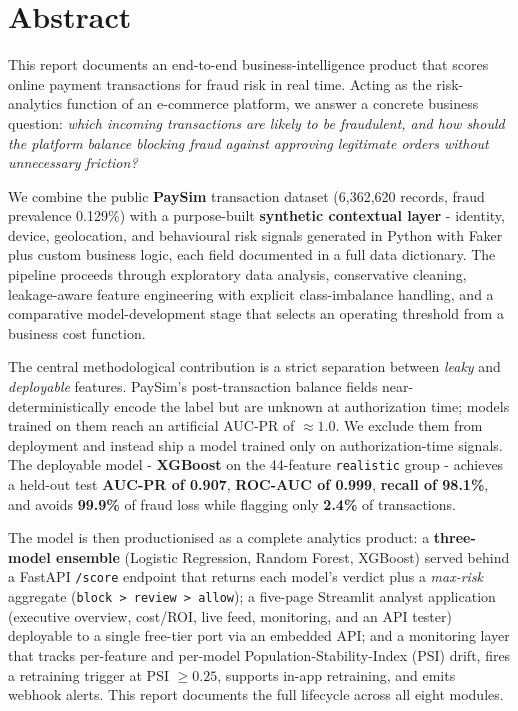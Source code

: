 \documentclass[11pt,a4paper]{report}
\newcommand{\code}[1]{\texttt{\small #1}}
\begin{document}
\chapter*{Abstract}
\thispagestyle{fancy}

This report documents an end-to-end business-intelligence product that scores online
payment transactions for fraud risk in real time. Acting as the risk-analytics function
of an e-commerce platform, we answer a concrete business question: \emph{which incoming
transactions are likely to be fraudulent, and how should the platform balance blocking
fraud against approving legitimate orders without unnecessary friction?}

We combine the public \textbf{PaySim} transaction dataset (6{,}362{,}620 records, fraud
prevalence 0.129\%) with a purpose-built \textbf{synthetic contextual layer} - identity,
device, geolocation, and behavioural risk signals generated in Python with Faker plus
custom business logic, each field documented in a full data dictionary. The pipeline
proceeds through exploratory data analysis, conservative cleaning, leakage-aware feature
engineering with explicit class-imbalance handling, and a comparative model-development
stage that selects an operating threshold from a business cost function.

The central methodological contribution is a strict separation between \emph{leaky} and
\emph{deployable} features. PaySim's post-transaction balance fields near-deterministically
encode the label but are unknown at authorization time; models trained on them reach an
artificial AUC-PR of $\approx 1.0$. We exclude them from deployment and instead ship a
model trained only on authorization-time signals. The deployable model - \textbf{XGBoost}
on the 44-feature \code{realistic} group - achieves a held-out test \textbf{AUC-PR of
0.907}, \textbf{ROC-AUC of 0.999}, \textbf{recall of 98.1\%}, and avoids \textbf{99.9\%}
of fraud loss while flagging only \textbf{2.4\%} of transactions.

The model is then productionised as a complete analytics product: a \textbf{three-model
ensemble} (Logistic Regression, Random Forest, XGBoost) served behind a FastAPI
\code{/score} endpoint that returns each model's verdict plus a \emph{max-risk} aggregate
(\code{block > review > allow}); a five-page Streamlit analyst application (executive
overview, cost/ROI, live feed, monitoring, and an API tester) deployable to a single free-tier port via an
embedded API; and a monitoring layer that tracks per-feature and per-model
Population-Stability-Index (PSI) drift, fires a retraining trigger at PSI $\ge 0.25$,
supports in-app retraining, and emits webhook alerts. This report documents the full
lifecycle across all eight modules.
\end{document}

